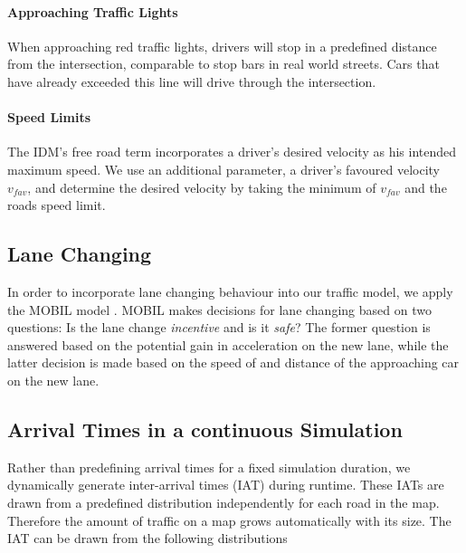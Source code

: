 \documentclass[10pt]{article}
\begin{document}
\paragraph{Approaching Traffic Lights} When approaching red traffic lights, drivers will stop in a predefined distance from the intersection, comparable to stop bars in real world streets. Cars that have already exceeded this line will drive through the intersection. 

\paragraph{Speed Limits} The IDM's free road term incorporates a driver's desired velocity as his intended maximum speed. We use an additional parameter, a driver's favoured velocity $v_{fav}$, and determine the desired velocity by taking the minimum of $v_{fav}$ and the roads speed limit.

\subsection{Lane Changing}
In order to incorporate lane changing behaviour into our traffic model, we apply the MOBIL model \citep{treiber2002realistische, kesting2007general}. MOBIL makes decisions for lane changing based on two questions: Is the lane change \textit{incentive} and is it \textit{safe}? The former question is answered based on the potential gain in acceleration on the new lane, while the latter decision is made based on the speed of and distance of the approaching car on the new lane.

\subsection{Arrival Times in a continuous Simulation}
Rather than predefining arrival times for a fixed simulation duration, we dynamically generate inter-arrival times (IAT) during runtime. These IATs are drawn from a predefined distribution independently for each road in the map. Therefore the amount of traffic on a map grows automatically with its size. The IAT can be drawn from the following distributions
\end{document}
